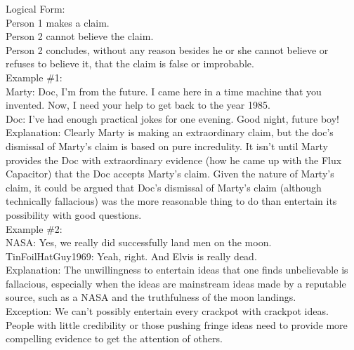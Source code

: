 \documentclass[a4paper,12pt,single,pdftex]{scrbook}
\begin{document}
{    
      Logical Form:
    \\

    
      Person 1 makes a claim.
    \\

    
      Person 2 cannot believe the claim.
    \\

    
      Person 2 concludes, without any reason besides he or she cannot believe or refuses to believe it, that the claim is false or improbable.
    \\

    
      Example \#1:
    \\

    
      Marty: Doc, I'm from the future. I came here in a time machine that you invented. Now, I need your help to get back to the year 1985.
    \\

    
      Doc: I've had enough practical jokes for one evening. Good night, future boy!
    \\

    
      Explanation: Clearly Marty is making an extraordinary claim, but the doc's dismissal of Marty's claim is based on pure incredulity. It isn't until Marty provides the Doc with extraordinary evidence (how he came up with the Flux Capacitor) that the Doc accepts Marty's claim. Given the nature of Marty's claim, it could be argued that Doc's dismissal of Marty's claim (although technically fallacious) was the more reasonable thing to do than entertain its possibility with good questions.
    \\

    
      Example \#2:
    \\

    
      NASA: Yes, we really did successfully land men on the moon.
    \\

    
      TinFoilHatGuy1969: Yeah, right. And Elvis is really dead.
    \\

    
      Explanation: The unwillingness to entertain ideas that one finds unbelievable is fallacious, especially when the ideas are mainstream ideas made by a reputable source, such as a NASA and the truthfulness of the moon landings.
    \\

    
      Exception: We can't possibly entertain every crackpot with crackpot ideas. People with little credibility or those pushing fringe ideas need to provide more compelling evidence to get the attention of others.
    \\

}
\end{document}
